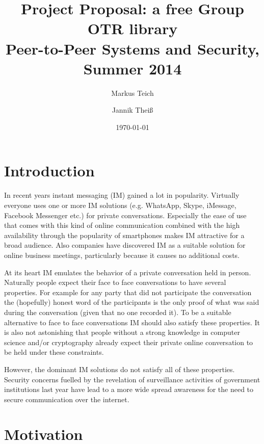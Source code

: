 

\title{Project Proposal: a free Group OTR library \\ {\small Peer-to-Peer Systems and Security, Summer 2014}}
\author{
	Markus Teich
	\and
	Jannik Theiß
}
\date{\today}



\maketitle


\section{Introduction}

In recent years instant messaging (IM) gained a lot in popularity. Virtually
everyone uses one or more IM solutions (e.g. WhatsApp, Skype, iMessage, Facebook
Messenger etc.) for private conversations. Especially the ease of use that comes
with this kind of online communication combined with the high availability
through the popularity of smartphones makes IM attractive for a broad audience.
Also companies have discovered IM as a suitable solution for online business
meetings, particularly because it causes no additional costs.

At its heart IM emulates the behavior of a private conversation held in person.
Naturally people expect their face to face conversations to have several
properties. For example for any party that did not participate the conversation
the (hopefully) honest word of the participants is the only proof of what was
said during the conversation (given that no one recorded it). To be a suitable
alternative to face to face conversations IM should also satisfy these
properties. It is also not astonishing that people without a strong knowledge in
computer science and/or cryptography already expect their private online
conversation to be held under these constraints.

However, the dominant IM solutions do not satisfy all of these properties.
Security concerns fuelled by the revelation of surveillance activities of
government institutions last year have lead to a more wide spread awareness for
the need to secure communication over the internet.


\section{Motivation}

